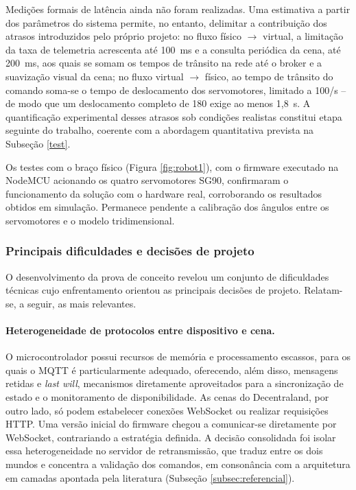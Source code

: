\documentclass[12pt]{article}
\begin{document}
Medições formais de latência ainda não foram realizadas. Uma estimativa a partir dos parâmetros do sistema permite, no entanto, delimitar a contribuição dos atrasos introduzidos pelo próprio projeto: no fluxo físico $\rightarrow$ virtual, a limitação da taxa de telemetria acrescenta até 100~ms e a consulta periódica da cena, até 200~ms, aos quais se somam os tempos de trânsito na rede até o broker e a suavização visual da cena; no fluxo virtual $\rightarrow$ físico, ao tempo de trânsito do comando soma-se o tempo de deslocamento dos servomotores, limitado a 100\textdegree/s -- de modo que um deslocamento completo de 180\textdegree{} exige ao menos 1,8~s. A quantificação experimental desses atrasos sob condições realistas constitui etapa seguinte do trabalho, coerente com a abordagem quantitativa prevista na Subseção \ref{test}.

Os testes com o braço físico (Figura \ref{fig:robot1}), com o firmware executado na NodeMCU acionando os quatro servomotores SG90, confirmaram o funcionamento da solução com o hardware real, corroborando os resultados obtidos em simulação. Permanece pendente a calibração dos ângulos entre os servomotores e o modelo tridimensional.

\subsubsection{Principais dificuldades e decisões de projeto}
\label{subsec:dificuldades}

O desenvolvimento da prova de conceito revelou um conjunto de dificuldades técnicas cujo enfrentamento orientou as principais decisões de projeto. Relatam-se, a seguir, as mais relevantes.

\paragraph{Heterogeneidade de protocolos entre dispositivo e cena.} O microcontrolador possui recursos de memória e processamento escassos, para os quais o MQTT é particularmente adequado, oferecendo, além disso, mensagens retidas e \textit{last will}, mecanismos diretamente aproveitados para a sincronização de estado e o monitoramento de disponibilidade. As cenas do Decentraland, por outro lado, só podem estabelecer conexões WebSocket ou realizar requisições HTTP. Uma versão inicial do firmware chegou a comunicar-se diretamente por WebSocket, contrariando a estratégia definida. A decisão consolidada foi isolar essa heterogeneidade no servidor de retransmissão, que traduz entre os dois mundos e concentra a validação dos comandos, em consonância com a arquitetura em camadas apontada pela literatura (Subseção \ref{subsec:referencial}).
\end{document}
